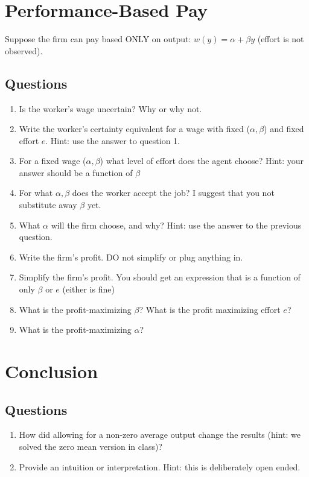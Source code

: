 \documentclass{article}
\begin{document}
\section{Performance-Based Pay}

Suppose the firm can pay based ONLY on output: $w(y)=\alpha + \beta y$ (effort is not observed).
\subsection{Questions}
\begin{enumerate}
    \item Is the worker's wage uncertain? Why or why not.
    \item Write the worker's certainty equivalent for a wage with fixed ($\alpha, \beta$) and fixed effort $e$. Hint: use the answer to question 1.
    \item For a fixed wage ($\alpha, \beta$) what level of effort does the agent choose? Hint: your answer should be a function of $\beta$
    \item For what $\alpha, \beta$ does the worker accept the job? I suggest that you not substitute away $\beta$ yet.
    \item What $\alpha$ will the firm choose, and why? Hint: use the answer to the previous question.
    \item Write the firm's profit. DO not simplify or plug anything in.
    \item Simplify the firm's profit. You should get an expression that is a function of only $\beta$ or $e$ (either is fine)
    \item What is the profit-maximizing $\beta$? What is the profit maximizing effort $e$?
    \item What is the profit-maximizing $\alpha$?
\end{enumerate}

\section{Conclusion}

\subsection{Questions}
\begin{enumerate}
    \item How did allowing for a non-zero average output change the results (hint: we solved the zero mean version in class)?
    \item Provide an intuition or interpretation. Hint: this is deliberately open ended.
\end{enumerate}
\end{document}
